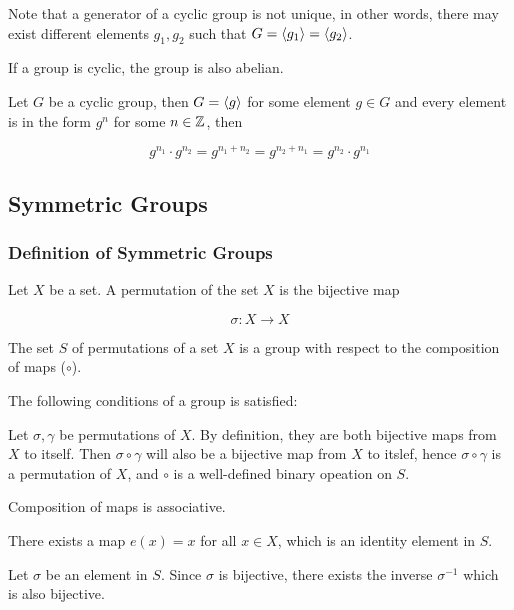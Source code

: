 \documentclass[a4paper,12pt]{article}
\begin{document}
Note that a generator of a cyclic group is not unique, in other words, there may exist different elements $g_{1},g_{2}$ such that $G=\left\langle g_{1}\right\rangle=\left\langle g_{2}\right\rangle$.\n

\begin{thm}
  If a group is cyclic, the group is also abelian.\n

  \prf Let $G$ be a cyclic group, then $G=\left\langle g\right\rangle$ for some element $g\in G$ and every element is in the form $g^{n}$ for some $n\in\mathbb{Z}$, then

  $$g^{n_{1}}\cdot g^{n_{2}}=g^{n_{1}+n_{2}}=g^{n_{2}+n_{1}}=g^{n_{2}}\cdot g^{n_{1}}$$
\end{thm}

\subsection{Symmetric Groups}
\subsubsection{Definition of Symmetric Groups}
\begin{dft}
  Let $X$ be a set. A permutation of the set $X$ is the bijective map

  $$\sigma:X\to X$$
\end{dft}\n

\begin{thm}
  The set $S$ of permutations of a set $X$ is a group with respect to the composition of maps ($\circ$).\n

  \prf The following conditions of a group is satisfied:

  \begin{alist}
    \item Let $\sigma,\gamma$ be permutations of $X$. By definition, they are both bijective maps from $X$ to itself. Then $\sigma\circ\gamma$ will also be a bijective map from $X$ to itslef, hence $\sigma\circ\gamma$ is a permutation of $X$, and $\circ$ is a well-defined binary opeation on $S$.
    \item Composition of maps is associative.
    \item There exists a map $e(x)=x$ for all $x\in X$, which is an identity element in $S$.
    \item Let $\sigma$ be an element in $S$. Since $\sigma$ is bijective, there exists the inverse $\sigma^{-1}$ which is also bijective.
  \end{alist}
\end{thm}\n
\end{document}
